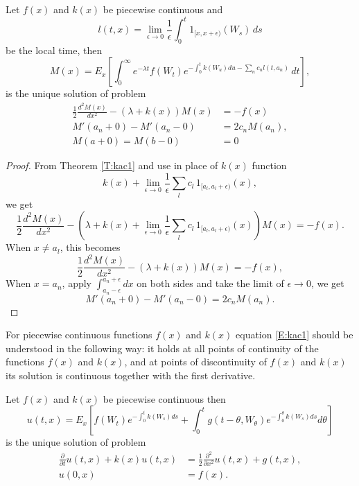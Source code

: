 \begin{theorem} \label{T:kac2}
Let $f(x)$ and $k(x)$ be piecewise continuous and
\begin{equation}
  l(t,x) = \lim_{\epsilon \to 0} \frac{1}{\epsilon}
           \int_0^t 1_{[x,x+\epsilon)}(W_s) \, ds
\end{equation}
be the local time, then
\begin{equation}
  M(x) = E_x 
        \left[
          \int_0^{\infty} e^{-\lambda t} f(W_t) 
            e^{-\int_0^t k(W_u) du - \sum_n c_n l(t,a_n)} \, dt 
        \right],
\end{equation} 
is the unique solution of problem
\begin{align}
  \frac{1}{2} \frac{d^2 M(x)}{dx^2} - (\lambda+k(x)) M(x) &= -f(x)
    \label{E:kac1} \\
  M'(a_n+0) - M'(a_n-0) &= 2 c_n M(a_n), \\
  M(a+0) = M(b-0) &= 0
\end{align}
\end{theorem}
\begin{proof}
From Theorem \ref{T:kac1} and use in place of $k(x)$ function
\[
  k(x) + \lim_{\epsilon \to 0} \frac{1}{\epsilon} \sum_l c_l
  \, 1_{[a_l,a_l+\epsilon)}(x),
\]
we get 
\[
  \frac{1}{2} \frac{d^2 M(x)}{dx^2} 
  - \left( \lambda + k(x)
      + \lim_{\epsilon \to 0} \frac{1}{\epsilon} \sum_l c_l
        \, 1_{[a_l,a_l+\epsilon)}(x)
    \right) M(x) = -f(x).
\]
When $x\neq a_l$, this becomes
\[
  \frac{1}{2} \frac{d^2 M(x)}{dx^2} - (\lambda+k(x)) M(x) = -f(x),
\]
When $x=a_n$, apply $\int_{a_n-\epsilon}^{a_n+\epsilon} dx$ on both sides and
take the limit of $\epsilon \to 0$, we get
\[
  M'(a_n+0) - M'(a_n-0) = 2 c_n M(a_n).
\]
\end{proof}

\begin{remark}
For piecewise continuous functions $f(x)$ and $k(x)$ equation \ref{E:kac1} 
should be understood in the following way: it holds at all points of 
continuity of the functions $f(x)$ and $k(x)$, and at points of discontinuity 
of $f(x)$ and $k(x)$ its solution is continuous together with the first 
derivative.
\end{remark}

\begin{theorem} 
Let $f(x)$ and $k(x)$ be piecewise continuous then
\begin{equation}
  u(t,x)=E_x 
    \left[
      f(W_t) e^{-\int_0^t k(W_s) ds}
      + \int_0^t g(t-\theta,W_{\theta}) e^{-\int_0^{\theta} k(W_s) ds} d\theta
    \right]
\end{equation}
is the unique solution of problem
\begin{align}
  \frac{\partial}{\partial t} u(t,x)  + k(x) u(t,x)
    &= \frac{1}{2} \frac{\partial^2}{\partial x^2} u(t,x) + g(t,x),   \\ 
  u(0,x) &= f(x).
\end{align}
\end{theorem} 

